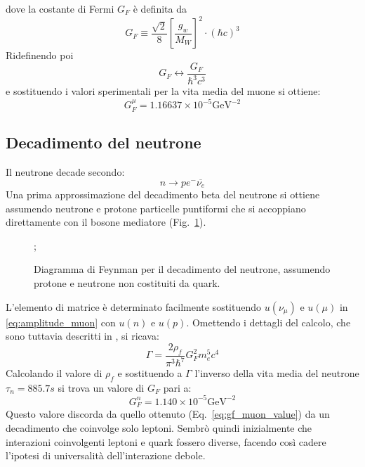 \documentclass{subnucbo}
\begin{document}
dove la costante di Fermi $G_{F}$ è definita da
\begin{equation}
        G _ { F } \equiv \frac { \sqrt { 2 } } { 8 } \left[ \frac { g _ { w } } { M _ { W } } \right] ^ { 2 } \cdot ( \hbar c ) ^ { 3 }
        \label{eq:fermi_constant}
\end{equation}
Ridefinendo poi
\begin{equation}
        G_{F} \leftrightarrow \frac{G_{F}}{\hbar^{3}c^{3}}
        \label{eq:fermi_constant_ridef}
\end{equation}
e sostituendo i valori sperimentali per la vita media del muone si ottiene:
\begin{equation}
        G^{\mu} _ { F } = 1.16637 \times 10 ^ { - 5 } \mathrm { GeV } ^ { - 2 }
        \label{eq:gf_muon_value}
\end{equation}

\subsection{Decadimento del neutrone}
Il neutrone decade secondo:
\begin{equation}
        n \rightarrow p e^{-} \overline{\nu_{e}}
        \label{eq:neutron_decay}
\end{equation}
Una prima approssimazione del decadimento beta del neutrone si ottiene assumendo neutrone e protone particelle puntiformi che si accoppiano direttamente con il bosone mediatore (Fig.~\ref{fig:neutron_decay_simple}).
\begin{figure}[!h]
        \centering
        ;
        \caption{Diagramma di Feynman per il decadimento del neutrone, assumendo protone e neutrone non costituiti da quark.}
        \label{fig:neutron_decay_simple}
\end{figure}
L'elemento di matrice è determinato facilmente sostituendo $u(\nu_{\mu})$ e $u(\mu)$ in \ref{eq:amplitude_muon} con $u(n)$ e $u(p)$. Omettendo i dettagli del calcolo, che sono tuttavia descritti in \cite{ref:hayes}, si ricava:
\begin{equation}
        \Gamma = \frac { 2 \rho_{f} } { \pi ^ { 3 } \hbar ^ { 7 } } G _ { F } ^ { 2 } m _ { e } ^ { 5 } c ^ { 4 }
        \label{eq:neutron_decay_rate}
\end{equation}
Calcolando il valore di $\rho_{f}$ \cite{ref:BGSex} e sostituendo a $\Gamma$ l'inverso della vita media del neutrone $\tau_{n}=885.7 s$ si trova un valore di $G_{F}$ pari a:
\begin{equation}
        G^{n} _ { F } = 1.140 \times 10 ^ { - 5 } \mathrm { GeV } ^ { - 2 }
        \label{eq:gf_neutron_value}
\end{equation}
Questo valore discorda da quello ottenuto (Eq.~\ref{eq:gf_muon_value}) da un decadimento che coinvolge solo leptoni. Sembrò quindi inizialmente che interazioni coinvolgenti leptoni e quark fossero diverse, facendo così cadere l'ipotesi di universalità dell'interazione debole.
\end{document}
